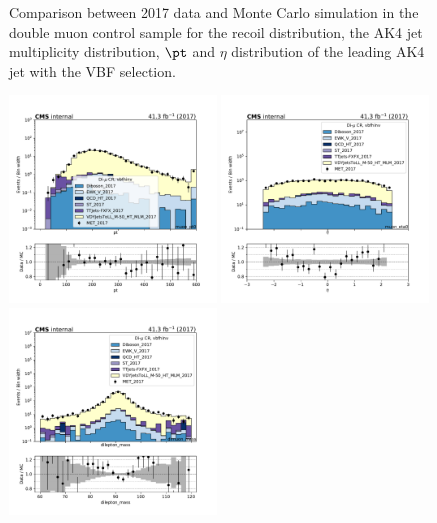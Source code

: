 {\begin{figure}[htbp]
\begin{center}
    \end{center}
    \caption{Comparison between 2017 data and Monte Carlo simulation in the double muon control sample for
        the recoil distribution, the AK4 jet multiplicity distribution,  $\pt$ and $\eta$ distribution
        of the leading AK4  jet with the VBF selection.}
    \label{fig:DM_vbfhinv_2017}
\end{figure}

\begin{figure}[htbp]
    \begin{center}
        \includegraphics[width=0.49\textwidth]{fig/datamc/cr_2m_vbf/cr_2m_vbf_muon_pt0_losf_2017.pdf}
        \includegraphics[width=0.49\textwidth]{fig/datamc/cr_2m_vbf/cr_2m_vbf_muon_eta0_losf_2017.pdf} \\
        \includegraphics[width=0.49\textwidth]{fig/datamc/cr_2m_vbf/cr_2m_vbf_dimuon_mass_losf_2017.pdf}

\end{center}
\end{figure}}
